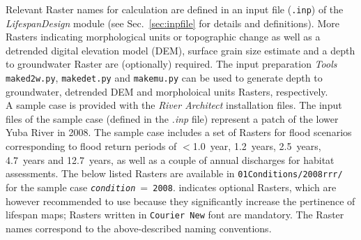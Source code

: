 Relevant Raster names for calculation are defined in an input file (\texttt{.inp}) of the \textit{LifespanDesign} module (see Sec.~\ref{sec:inpfile} for details and definitions). More Rasters indicating morphological units \citep[e.g.][]{wyrick14b} or topographic change \citep[e.g.][]{carley12} as well as a detrended digital elevation model (DEM), surface grain size estimate and a depth to groundwater Raster are (optionally) required. The input preparation \textit{Tools} \texttt{make{\myUnderscore}d2w.py}, \texttt{make{\myUnderscore}det.py} and \texttt{make{\myUnderscore}mu.py} can be used to generate depth to groundwater, detrended DEM and morpholoical units Rasters, respectively.\\
A sample case is provided with the \textit{River Architect} installation files. The input files of the sample case (defined in the \textit{.inp} file) represent a patch of the lower Yuba River in 2008. The sample case includes a set of Rasters for flood scenarios corresponding to flood return periods of $< $1.0~year, 1.2~years, 2.5~years, 4.7~years and 12.7~years, as well as a couple of annual discharges for habitat assessments. The below listed Rasters are available in \texttt{01{\myUnderscore}Conditions/2008{\myUnderscore}rrr/} for the sample case \texttt{\textit{condition}}~=~\texttt{2008}.  indicates optional Rasters, which are however recommended to use because they significantly increase the pertinence of lifespan maps; Rasters written in \texttt{Courier New} font are mandatory. The Raster names correspond to the above-described naming conventions.\\
